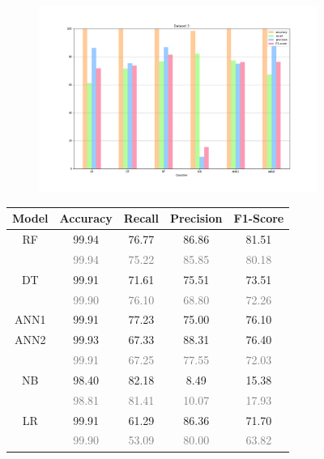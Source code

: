 \documentclass{Configuration_Files/PoliMi3i_thesis}
\begin{document}
\begin{figure}[H]
\centering
\begin{subfigure}
    \centering
    \includegraphics[scale=0.3]{Images/Dataset_3.png}
\end{subfigure}

\renewcommand{\arraystretch}{0.8}%
\begin{table}[H]
\centering 
    \begin{tabular}{ c  c  c  c  c }
    \hline 
    \textbf{Model}  & \textbf{Accuracy} & \textbf{Recall} & \textbf{Precision} & \textbf{F1-Score} \\
    \hline
    RF	& 99.94 &	76.77 &	86.86 &	81.51 \\
        & \footnotesize\textcolor{gray}{99.94} & \footnotesize\textcolor{gray}{75.22} & \footnotesize\textcolor{gray}{85.85} & \footnotesize\textcolor{gray}{80.18} \\[0.01cm]
    DT	& 99.91 &	71.61 &	75.51 &	73.51 \\
        & \footnotesize\textcolor{gray}{99.90} & \footnotesize\textcolor{gray}{76.10} & \footnotesize\textcolor{gray}{68.80} & \footnotesize\textcolor{gray}{72.26} \\
    ANN1 & 99.91 & 77.23 & 75.00 & 76.10 \\
    ANN2 & 99.93 & 67.33 & 88.31 & 76.40 \\
         & \footnotesize\textcolor{gray}{99.91} & \footnotesize\textcolor{gray}{67.25} & \footnotesize\textcolor{gray}{77.55} & \footnotesize\textcolor{gray}{72.03} \\
    NB	& 98.40 &	82.18 &	8.49 &	15.38 \\
        & \footnotesize\textcolor{gray}{98.81} & \footnotesize\textcolor{gray}{81.41} & \footnotesize\textcolor{gray}{10.07} & \footnotesize\textcolor{gray}{17.93} \\
    LR	& 99.91 &	61.29 &	86.36 &	71.70 \\
        & \footnotesize\textcolor{gray}{99.90} & \footnotesize\textcolor{gray}{53.09} & \footnotesize\textcolor{gray}{80.00} & \footnotesize\textcolor{gray}{63.82} \\
    \hline
    \end{tabular}
\end{table}


\end{figure}
\end{document}
